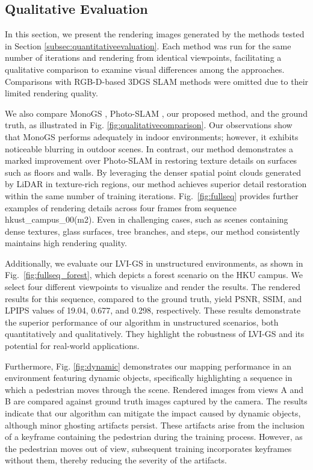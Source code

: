 \documentclass[lettersize,journal]{IEEEtran}
\begin{document}
\subsection{Qualitative Evaluation}
In this section, we present the rendering images generated by the methods tested in Section \ref{subsec:quantitativeevaluation}. Each method was run for the same number of iterations and rendering from identical viewpoints, facilitating a qualitative comparison to examine visual differences among the approaches. Comparisons with RGB-D-based 3DGS SLAM methods were omitted due to their limited rendering quality.

We also compare MonoGS \cite{monogs}, Photo-SLAM \cite{photoslam}, our proposed method, and the ground truth, as illustrated in Fig. \ref{fig:qualitativecomparison}. Our observations show that MonoGS \cite{monogs} performs adequately in indoor environments; however, it exhibits noticeable blurring in outdoor scenes. In contrast, our method demonstrates a marked improvement over Photo-SLAM \cite{photoslam} in restoring texture details on surfaces such as floors and walls. By leveraging the denser spatial point clouds generated by LiDAR in texture-rich regions, our method achieves superior detail restoration within the same number of training iterations. Fig.~\ref{fig:fullseq} provides further examples of rendering details across four frames from sequence hkust_campus_00(m2)\cite{r3live}. Even in challenging cases, such as scenes containing dense textures, glass surfaces, tree branches, and steps, our method consistently maintains high rendering quality.

Additionally, we evaluate our LVI-GS in unstructured environments, as shown in Fig.~\ref{fig:fullseq_forest}, which depicts a forest scenario on the HKU campus. 
We select four different viewpoints to visualize and render the results. 
The rendered results for this sequence, compared to the ground truth, yield PSNR, SSIM, and LPIPS values of 19.04, 0.677, and 0.298, respectively.
These results demonstrate the superior performance of our algorithm in unstructured scenarios, both quantitatively and qualitatively. They highlight the robustness of LVI-GS and its potential for real-world applications.

Furthermore, Fig. \ref{fig:dynamic} demonstrates our mapping performance in an environment featuring dynamic objects, specifically highlighting a sequence in which a pedestrian moves through the scene. Rendered images from views A and B are compared against ground truth images captured by the camera. The results indicate that our algorithm can mitigate the impact caused by dynamic objects, although minor ghosting artifacts persist. These artifacts arise from the inclusion of a keyframe containing the pedestrian during the training process. However, as the pedestrian moves out of view, subsequent training incorporates keyframes without them, thereby reducing the severity of the artifacts.
\end{document}
